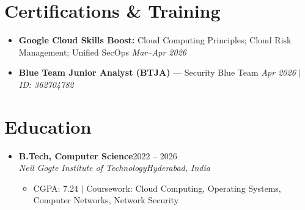 \documentclass[letterpaper,10.5pt]{article}
\newcommand{\resumeItem}[1]{\item\small{#1\vspace{-1pt}}}
\newcommand{\resumeSubheading}[4]{\vspace{1pt}\item
  \textbf{#1}\hfill{\small #2}\\
  \textit{\small #3}\hfill{\textit{\small #4}}\vspace{-5pt}}
\newcommand{\resumeSubHeadingListStart}{\begin{itemize}[leftmargin=0.15in,label={}]}
\newcommand{\resumeSubHeadingListEnd}{\end{itemize}\vspace{-4pt}}
\newcommand{\resumeItemListStart}{\begin{itemize}[leftmargin=0.20in,itemsep=1pt,topsep=2pt]}
\newcommand{\resumeItemListEnd}{\end{itemize}\vspace{-3pt}}
\begin{document}
\section{Certifications \& Training}
\begin{itemize}[leftmargin=0.15in, label={$\bullet$}, itemsep=1.5pt, topsep=2pt]
  \small
  \item \textbf{Google Cloud Skills Boost:} Cloud Computing Principles; Cloud Risk Management; Unified SecOps \hfill \textit{Mar--Apr 2026}
  \item \textbf{Blue Team Junior Analyst (BTJA)} --- Security Blue Team \hfill \textit{Apr 2026 $|$ ID: 362704782}
\end{itemize}
\vspace{-4pt}

\section{Education}
\resumeSubHeadingListStart
  \resumeSubheading{B.Tech, Computer Science}{2022 -- 2026}{Neil Gogte Institute of Technology}{Hyderabad, India}
  \resumeItemListStart
    \resumeItem{CGPA: 7.24 $|$ Coursework: Cloud Computing, Operating Systems, Computer Networks, Network Security}
  \resumeItemListEnd
\resumeSubHeadingListEnd
\end{document}

